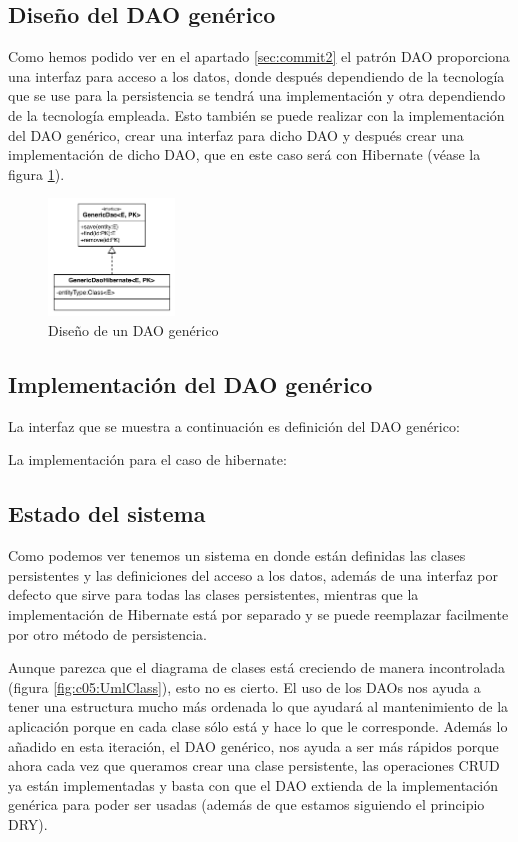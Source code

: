 \documentclass{article}
\begin{document}
\subsection{Diseño del DAO genérico}
	Como hemos podido ver en el apartado \ref{sec:commit2} el patrón DAO proporciona una interfaz para acceso a los datos, donde después dependiendo de la tecnología que se use para la persistencia se tendrá una implementación y otra dependiendo de la tecnología empleada. Esto también se puede realizar con la implementación del DAO genérico, crear una interfaz para dicho DAO y después crear una implementación de dicho DAO, que en este caso será con Hibernate (véase la figura \ref{fig:c05:GenericDao}).

\begin{figure}[h]
  \centering
    \includegraphics[width=0.3\textwidth]{commit05/img/GenericDao.pdf}
  \caption{Diseño de un DAO genérico}
  \label{fig:c05:GenericDao}
\end{figure}	

\subsection{Implementación del DAO genérico}
La interfaz que se muestra a continuación es definición del DAO genérico:


La implementación para el caso de hibernate:


\subsection{Estado del sistema}
	Como podemos ver tenemos un sistema en donde están definidas las clases persistentes y las definiciones del acceso a los datos, además de una interfaz por defecto que sirve para todas las clases persistentes, mientras que la implementación de Hibernate está por separado y se puede reemplazar facilmente por otro método de persistencia.
	
	Aunque parezca que el diagrama de clases está creciendo de manera incontrolada (figura \ref{fig:c05:UmlClass}), esto no es cierto. El uso de los DAOs nos ayuda a tener una estructura mucho más ordenada lo que ayudará al mantenimiento de la aplicación porque en cada clase sólo está y hace lo que le corresponde. Además lo añadido en esta iteración, el DAO genérico, nos ayuda a ser más rápidos porque ahora cada vez que queramos crear una clase persistente, las operaciones CRUD ya están implementadas y basta con que el DAO extienda de la implementación genérica para poder ser usadas (además de que estamos siguiendo el principio DRY).
	
\end{document}
